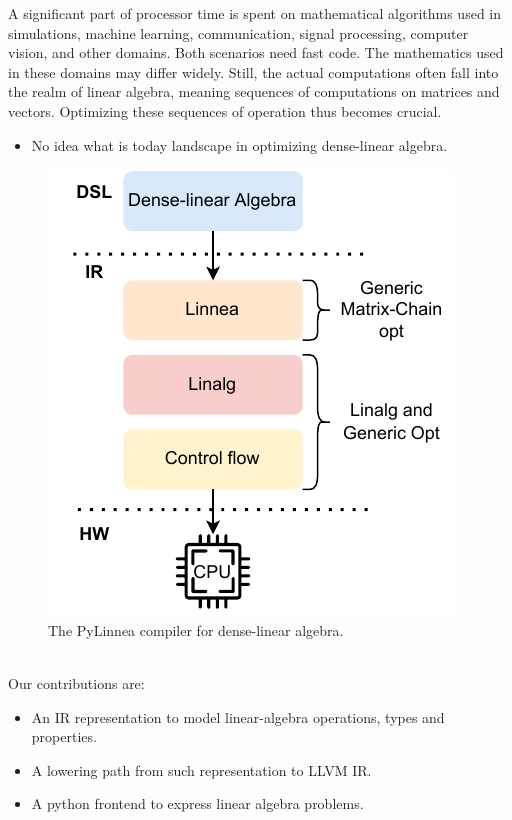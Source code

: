 \documentclass[conference]{IEEEtran}
\begin{document}
A significant part of processor time is spent on mathematical algorithms used
in simulations, machine learning, communication, signal processing, computer
vision, and other domains. Both scenarios need fast code. The mathematics used
in these domains may differ widely. Still, the actual computations often fall
into the realm of linear algebra, meaning sequences of computations on matrices
and vectors. Optimizing these sequences of operation thus becomes crucial.

\begin{itemize}
  \item No idea what is today landscape in optimizing dense-linear algebra.
\end{itemize}

\begin{figure}
%
\includegraphics[width=0.7\columnwidth]{images/Impact2022.drawio.pdf}
\caption{The PyLinnea compiler for dense-linear algebra.}
\end{figure}

~\\
Our contributions are:

\begin{itemize}
	\item An IR representation to model linear-algebra operations, types and properties.
	\item A lowering path from such representation to LLVM IR.
  \item A python frontend to express linear algebra problems.
\end{itemize}
\end{document}
